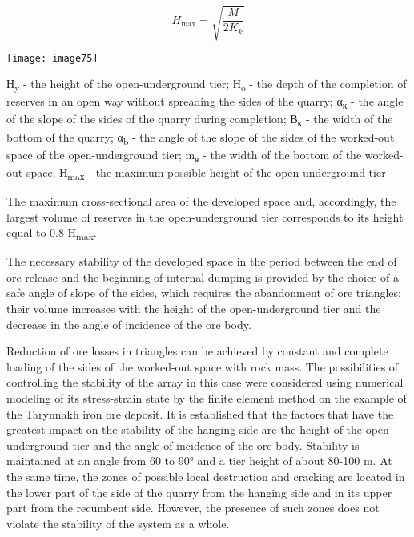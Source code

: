 \begin{multicols}{2}
\begin{equation}
H_{\text{max}} = \sqrt{\frac{M}{2K_{k}}}
\end{equation}

{    \centering
    \texttt{[image: image75]}
    }

Н\textsubscript{y} - the height of the open-underground tier;
Н\textsubscript{o} - the depth of the completion of reserves in an open
way without spreading the sides of the quarry; α\textsubscript{к} - the
angle of the slope of the sides of the quarry during completion;
В\textsubscript{к} - the width of the bottom of the quarry;
α\textsubscript{b} - the angle of the slope of the sides of the
worked-out space of the open-underground tier; m\textsubscript{я} - the
width of the bottom of the worked-out space; Н\textsubscript{maх} - the
maximum possible height of the open-underground tier

The maximum cross-sectional area of the developed space and,
accordingly, the largest volume of reserves in the open-underground tier
corresponds to its height equal to 0.8 H\textsubscript{max}.

The necessary stability of the developed space in the period between the
end of ore release and the beginning of internal dumping is provided by
the choice of a safe angle of slope of the sides, which requires the
abandonment of ore triangles; their volume increases with the height of
the open-underground tier and the decrease in the angle of incidence of
the ore body.

Reduction of ore losses in triangles can be achieved by constant and
complete loading of the sides of the worked-out space with rock mass.
The possibilities of controlling the stability of the array in this case
were considered using numerical modeling of its stress-strain state by
the finite element method on the example of the Tarynnakh iron ore
deposit. It is established that the factors that have the greatest
impact on the stability of the hanging side are the height of the
open-underground tier and the angle of incidence of the ore body.
Stability is maintained at an angle from 60 to 90° and a tier height of
about 80-100 m. At the same time, the zones of possible local
destruction and cracking are located in the lower part of the side of
the quarry from the hanging side and in its upper part from the
recumbent side. However, the presence of such zones does not violate the
stability of the system as a whole.


\end{multicols}
